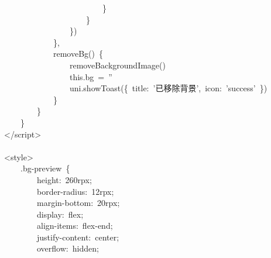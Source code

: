 \documentclass[a4paper,10pt]{article}
\begin{document}
{~~~~~~~~~~~~~~~~~~~~~~~~\}\\
~~~~~~~~~~~~~~~~~~~~\}\\
~~~~~~~~~~~~~~~~\})\\
~~~~~~~~~~~~\},\\
~~~~~~~~~~~~removeBg()~\{\\
~~~~~~~~~~~~~~~~removeBackgroundImage()\\
~~~~~~~~~~~~~~~~this.bg~=~''\\
~~~~~~~~~~~~~~~~uni.showToast(\{~title:~'已移除背景',~icon:~'success'~\})\\
~~~~~~~~~~~~\}\\
~~~~~~~~\}\\
~~~~\}\\
</script>\\
\mbox{}\\
<style>\\
~~~~.bg-preview~\{\\
~~~~~~~~height:~260rpx;\\
~~~~~~~~border-radius:~12rpx;\\
~~~~~~~~margin-bottom:~20rpx;\\
~~~~~~~~display:~flex;\\
~~~~~~~~align-items:~flex-end;\\
~~~~~~~~justify-content:~center;\\
~~~~~~~~overflow:~hidden;
}

\newpage
\end{document}
